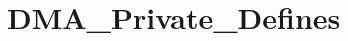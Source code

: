 \hypertarget{group___d_m_a___private___defines}{\section{D\-M\-A\-\_\-\-Private\-\_\-\-Defines}
\label{group___d_m_a___private___defines}
}
